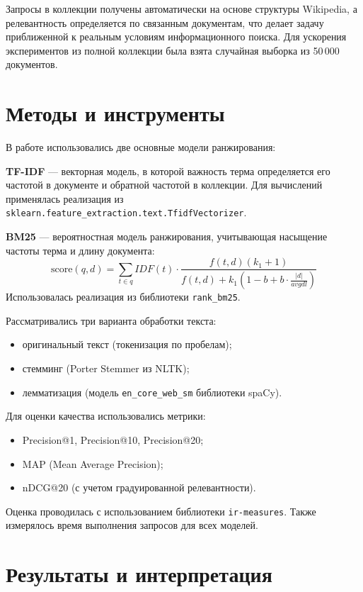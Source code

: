 \documentclass[11pt]{article}
\begin{document}
Запросы в коллекции получены автоматически на основе структуры Wikipedia, а
релевантность определяется по связанным документам, что делает задачу приближенной
к реальным условиям информационного поиска. Для ускорения экспериментов из полной
коллекции была взята случайная выборка из 50\,000 документов.

\section{Методы и инструменты}

В работе использовались две основные модели ранжирования:

\textbf{TF-IDF} — векторная модель, в которой важность терма определяется его
частотой в документе и обратной частотой в коллекции. Для вычислений применялась
реализация из \texttt{sklearn.feature\_extraction.text.TfidfVectorizer}.

\textbf{BM25} — вероятностная модель ранжирования, учитывающая насыщение частоты
терма и длину документа:
\begin{equation}
\text{score}(q, d) = \sum_{t \in q} IDF(t) \cdot \frac{f(t,d)(k_1+1)}{f(t,d)+k_1(1-b+b\cdot \frac{|d|}{avgdl})}
\end{equation}
Использовалась реализация из библиотеки \texttt{rank\_bm25}.

Рассматривались три варианта обработки текста:
\begin{itemize}
    \item оригинальный текст (токенизация по пробелам);
    \item стемминг (Porter Stemmer из NLTK);
    \item лемматизация (модель \texttt{en\_core\_web\_sm} библиотеки spaCy).
\end{itemize}

Для оценки качества использовались метрики:
\begin{itemize}
    \item Precision@1, Precision@10, Precision@20;
    \item MAP (Mean Average Precision);
    \item nDCG@20 (с учетом градуированной релевантности).
\end{itemize}

Оценка проводилась с использованием библиотеки \texttt{ir-measures}. Также
измерялось время выполнения запросов для всех моделей.

\section{Результаты и интерпретация}
\end{document}

